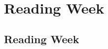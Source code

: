 \clearpage

\renewcommand{\ChapTitle}{Reading Week}
\renewcommand{\SectionTitle}{Reading Week}

\chapter{\ChapTitle}
\section{\SectionTitle}
